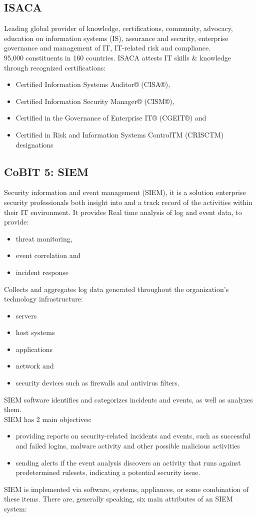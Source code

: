 \documentclass[8pt,a4]{extarticle}
\begin{document}
\begin{multicols}{3}
\subsection{ISACA}
Leading global provider of knowledge, certifications, community, advocacy, education on information systems (IS), 
assurance and security, enterprise governance and management of IT, IT-related risk and compliance.\\
95,000 constituents in 160 countries. ISACA attests IT skills \& knowledge through recognized certifications:
\begin{itemize}
    \item Certified Information Systems Auditor® (CISA®),
    \item Certified Information Security Manager® (CISM®),
    \item Certified in the Governance of Enterprise IT® (CGEIT®) and
    \item Certified in Risk and Information Systems ControlTM (CRISCTM) designations
\end{itemize}

\subsection{CoBIT 5: SIEM}
Security information and event management (SIEM), it is a solution enterprise security professionals both insight into
and a track record of the activities within their IT environment. It provides Real time analysis of log and event data,
to provide: 
\begin{itemize}
    \item threat monitoring,
    \item event correlation and
    \item incident response
\end{itemize}
\noindent
Collects and aggregates log data generated throughout the
organization’s technology infrastructure:
\begin{itemize}
    \item servers
    \item host systems
    \item applications
    \item network and
    \item security devices such as firewalls and antivirus filters.
\end{itemize}

SIEM software identifies and categorizes incidents and events, as well as analyzes them. \\
SIEM has 2 main objectives:
\begin{itemize}
    \item providing reports on security-related incidents and events,
    such as successful and failed logins, malware activity and
    other possible malicious activities
    \item sending alerts if the event analysis discovers an activity that
    runs against predetermined rulesets, indicating a potential
    security issue.
\end{itemize}

SIEM is implemented via software, systems, appliances, or some combination of these items. 
There are, generally speaking, six main attributes of an SIEM system:

\end{multicols}
\end{document}
